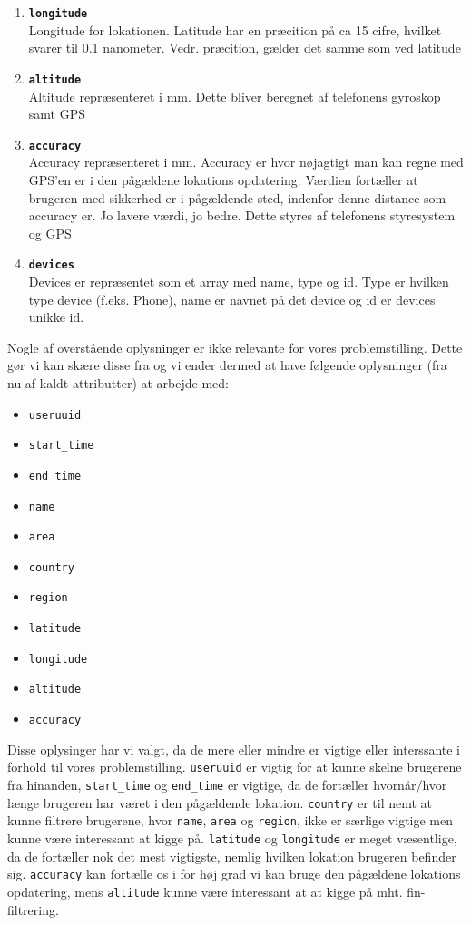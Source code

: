 \begin{enumerate}
\item \texttt{\textbf{longitude}}\\Longitude for lokationen. Latitude har en præcition på ca 15 cifre, hvilket svarer til 0.1 nanometer. Vedr. præcition, gælder det samme som ved latitude
\item \texttt{\textbf{altitude}}\\Altitude repræsenteret i mm. Dette bliver beregnet af telefonens gyroskop samt GPS
\item \texttt{\textbf{accuracy}}\\Accuracy repræsenteret i mm. Accuracy er hvor nøjagtigt man kan regne med GPS'en er i den pågældene lokations opdatering. Værdien fortæller at brugeren med sikkerhed er i pågældende sted, indenfor denne distance som accuracy er. Jo lavere værdi, jo bedre. Dette styres af telefonens styresystem og GPS
\item \texttt{\textbf{devices}}\\Devices er repræsentet som et array med name, type og id. Type er hvilken type device (f.eks. Phone), name er navnet på det device og id er devices unikke id. 
\end{enumerate}

Nogle af overstående oplysninger er ikke relevante for vores problemstilling. Dette gør vi kan skære disse fra og vi ender dermed at have følgende oplysninger (fra nu af kaldt  attributter) at arbejde med: 

\begin{itemize}
\item \texttt{useruuid}
\item \texttt{start\_time}
\item \texttt{end\_time}
\item \texttt{name}
\item \texttt{area}
\item \texttt{country}
\item \texttt{region}
\item \texttt{latitude}
\item \texttt{longitude}
\item \texttt{altitude}
\item \texttt{accuracy}
\end{itemize}

Disse oplysinger har vi valgt, da de mere eller mindre er vigtige eller interssante i forhold til vores problemstilling. \texttt{useruuid} er vigtig for at kunne skelne brugerene fra hinanden, \texttt{start\_time} og \texttt{end\_time} er vigtige, da de fortæller hvornår/hvor længe brugeren har været i den pågældende lokation. \texttt{country} er til nemt at kunne filtrere brugerene, hvor \texttt{name}, \texttt{area} og \texttt{region}, ikke er særlige vigtige men kunne være interessant at kigge på. \texttt{latitude} og \texttt{longitude} er meget væsentlige, da de fortæller nok det mest vigtigste, nemlig hvilken lokation brugeren befinder sig. \texttt{accuracy} kan fortælle os i for høj grad vi kan bruge den pågældene lokations opdatering, mens \texttt{altitude} kunne være interessant at at kigge på mht. fin-filtrering. 

